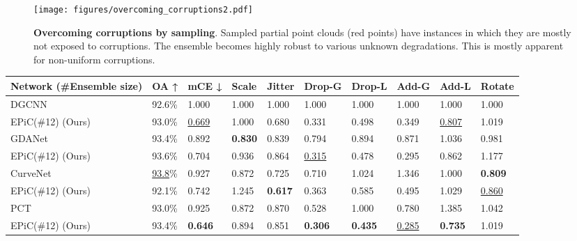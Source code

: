 \documentclass[10pt,twocolumn]{article}
\begin{document}
\begin{figure}[ptbh!]
  \centering
\texttt{[image: figures/overcoming\_corruptions2.pdf]}
   \caption{{\bf Overcoming corruptions by sampling}.
   Sampled partial point clouds (red points) have instances in which they are mostly not exposed to corruptions. The ensemble becomes highly robust to various unknown degradations. This is mostly apparent for non-uniform corruptions.
}
   \label{fig:corruptions}
\end{figure}












\begin{table*}
  \centering
\begin{tabular}{p{3.8cm} || p{1.0cm} p{1.0cm} p{1.0cm} p{1.0cm} p{1.1cm} p{1.1cm} p{1.0cm} p{1.0cm} p{0.8cm}}
    \hline
    Network (\#Ensemble size)& OA ↑ & mCE ↓ & Scale & Jitter & Drop-G & Drop-L & Add-G & Add-L & Rotate \\
    \hline
    DGCNN \cite{dgcnn} & 92.6\% & 1.000 & 1.000 &  1.000 & 1.000 & 1.000 & 1.000 & 1.000 & 1.000\\
    \hspace*{0.2cm} EPiC(\#12) (Ours) & 93.0\% & \underline{0.669} & 1.000 &  0.680 & 0.331 & 0.498 & 0.349 & \underline{0.807} & 1.019\\
    \hline
    GDANet\cite{gdanet} & 93.4\% & 0.892 & \textbf{0.830} & 0.839 & 0.794 &  0.894 & 0.871 & 1.036 &  0.981\\
    \hspace*{0.2cm} EPiC(\#12) (Ours) & 93.6\% & 0.704 & 0.936 &  0.864 & \underline{0.315} & 0.478 & 0.295 & 0.862 & 1.177\\
    \hline
    CurveNet\cite{curvenet} & \underline{93.8}\% & 0.927 & 0.872 & 0.725 & 0.710 &  1.024 & 1.346 & 1.000 &  \textbf{0.809}\\
    \hspace*{0.2cm} EPiC(\#12) (Ours)  & 92.1\% & 0.742 & 1.245 &  \textbf{0.617} & 0.363 & 0.585 & 0.495 & 1.029 & \underline{0.860}\\
    \hline
    PCT\cite{pct} & 93.0\% & 0.925 & 0.872 & 0.870 & 0.528 &  1.000 & 0.780 & 1.385 &  1.042\\
    \hspace*{0.2cm} EPiC(\#12) (Ours)  & 93.4\% & \textbf{0.646} & 0.894 &  0.851 & \textbf{0.306} & \textbf{0.435} & \underline{0.285} & \textbf{0.735} & 1.019\\

\end{tabular}
\end{table*}
\end{document}
